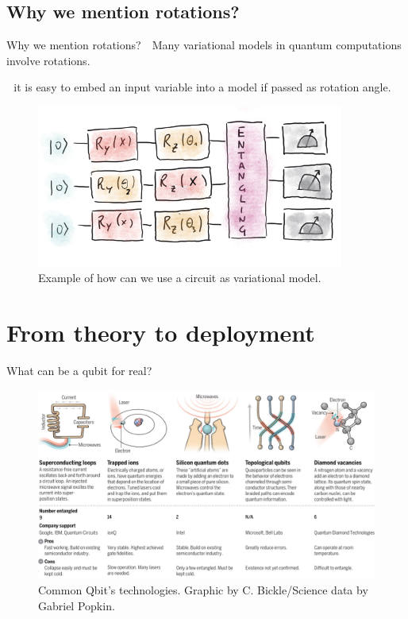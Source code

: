 \documentclass[8pt, xcolor={svgnames}, hyperref={colorlinks,linkcolor=black, citecolor=amethyst, urlcolor=amethyst}]{beamer}
\begin{document}
\subsection{Why we mention rotations?}

\begin{frame}{Why we mention rotations?}
\large 
    \faArrowCircleRight\,\, Many variational models in quantum computations involve rotations.
    
    \faArrowCircleRight\,\, it is easy to embed an input variable into a model if passed as rotation angle.

    \begin{figure}
    \centering 
    \includegraphics[width=0.9\textwidth]{figures/variational_model.png}
  \caption{Example of how can we use a circuit as variational model.}
  \end{figure}
\end{frame}

\section{From theory to deployment}

\begin{frame}{What can be a qubit for real?}
    \begin{figure}
    \centering 
    \includegraphics[width=\textwidth]{figures/Quantum_tech.png}
  \caption{Common Qbit's technologies. Graphic by C. Bickle/Science data by Gabriel Popkin.}
  \end{figure}
\end{frame}
\end{document}
